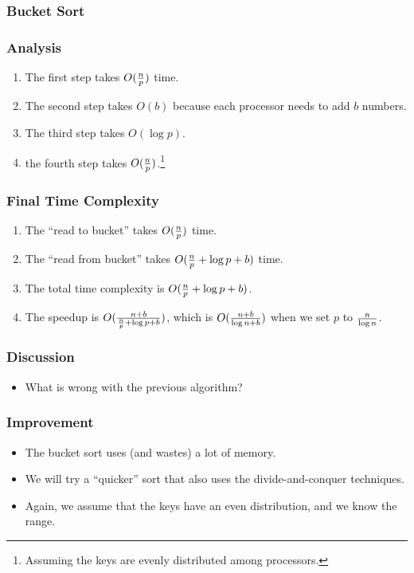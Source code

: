 \documentclass{beamer}
\begin{document}
\begin{CJK}{UTF8}{bsmi}
\begin{frame}
\frametitle{Bucket Sort}
\centerline{}
\end{frame}

\begin{frame}
\frametitle{Analysis}
\begin{enumerate}
\item The first step takes $O({n \over p})$ time.
\item The second step takes $O(b)$ because each processor needs to add
  $b$ numbers.
\item The third step takes  $O(\log p)$.
\item the fourth step takes $O({n \over p})$.\footnote{Assuming the
  keys are evenly distributed among processors.}
\end{enumerate}
\end{frame}

\begin{frame}
\frametitle{Final Time Complexity}
\begin{enumerate}
\item The ``read to bucket'' takes $O({n \over p})$ time.
\item The ``read from bucket'' takes $O({n \over p} + \log p + b)$ time.
\item The total time complexity is $O({n \over p} + \log p + b)$.
\item The speedup is $O({{n + b} \over {{n \over p} + \log p + b}})$, which is $O({{n + b} \over {\log n + b}})$ when we set $p$ to $n \over {\log n}$.
\end{enumerate}
\end{frame}

\begin{frame}
\frametitle{Discussion}
\begin{itemize}
\item What is wrong with the previous algorithm?
\end{itemize}
\end{frame}

\begin{frame}
\frametitle{Improvement}
\begin{itemize}
\item The bucket sort uses (and wastes) a lot of memory.
\item We will try a ``quicker'' sort that also uses the
  divide-and-conquer techniques.
\item Again, we assume that the keys have an even distribution, and we know the range.
\end{itemize}
\end{frame}


\end{CJK}
\end{document}
